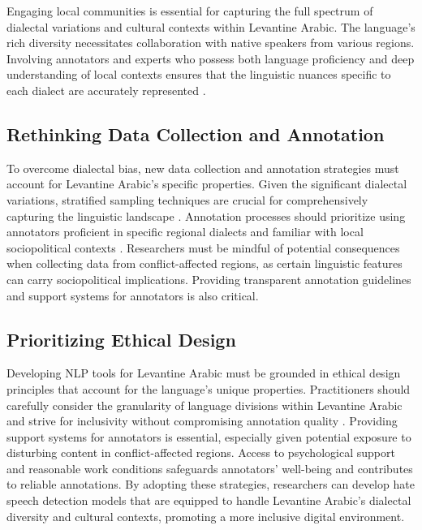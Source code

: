 \documentclass[11pt]{article}
\begin{document}
Engaging local communities is essential for capturing the full spectrum of dialectal variations and cultural contexts within Levantine Arabic. The language's rich diversity necessitates collaboration with native speakers from various regions. Involving annotators and experts who possess both language proficiency and deep understanding of local contexts ensures that the linguistic nuances specific to each dialect are accurately represented \citep{radiya-dixit_bogen_2024}.


\subsection{Rethinking Data Collection and Annotation}

To overcome dialectal bias, new data collection and annotation strategies must account for Levantine Arabic's specific properties. Given the significant dialectal variations, stratified sampling techniques are crucial for comprehensively capturing the linguistic landscape \citep{bergman2022responsiblenaturallanguageannotation}. Annotation processes should prioritize using annotators proficient in specific regional dialects and familiar with local sociopolitical contexts \citep{doi:10.1126/science.aal4230, radiya-dixit_bogen_2024}. Researchers must be mindful of potential consequences when collecting data from conflict-affected regions, as certain linguistic features can carry sociopolitical implications. Providing transparent annotation guidelines and support systems for annotators is also critical.


\subsection{Prioritizing Ethical Design}

Developing NLP tools for Levantine Arabic must be grounded in ethical design principles that account for the language's unique properties. Practitioners should carefully consider the granularity of language divisions within Levantine Arabic and strive for inclusivity without compromising annotation quality \citep{bergman2022responsiblenaturallanguageannotation}. Providing support systems for annotators is essential, especially given potential exposure to disturbing content in conflict-affected regions. Access to psychological support and reasonable work conditions safeguards annotators' well-being and contributes to reliable annotations. By adopting these strategies, researchers can develop hate speech detection models that are equipped to handle Levantine Arabic's dialectal diversity and cultural contexts, promoting a more inclusive digital environment.
\end{document}
